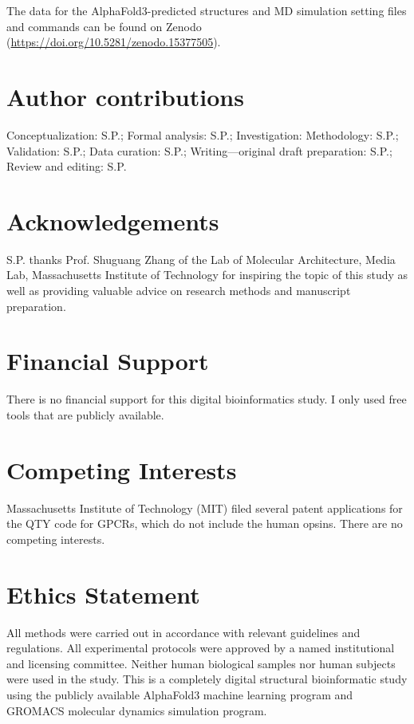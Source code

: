 \documentclass[fleqn, 10pt]{manuscript}
\begin{document}
The data for the AlphaFold3-predicted structures and MD simulation setting files and commands can be found on Zenodo (\url{https://doi.org/10.5281/zenodo.15377505}). 

\section*{Author contributions}

Conceptualization: S.P.; Formal analysis: S.P.; Investigation: Methodology: S.P.; Validation: S.P.; Data curation: S.P.; Writing—original draft preparation: S.P.; Review and editing: S.P. 

\section*{Acknowledgements}

S.P. thanks Prof. Shuguang Zhang of the Lab of Molecular Architecture, Media Lab, Massachusetts Institute of Technology for inspiring the topic of this study as well as providing valuable advice on research methods and manuscript preparation. 

\section*{Financial Support}

There is no financial support for this digital bioinformatics study. I only used free tools that are publicly available. 

\section*{Competing Interests}

Massachusetts Institute of Technology (MIT) filed several patent applications for the QTY code for GPCRs, which do not include the human opsins. There are no competing interests.


\section*{Ethics Statement}

All methods were carried out in accordance with relevant guidelines and regulations. All experimental protocols were approved by a named institutional and licensing committee. Neither human biological samples nor human subjects were used in the study. This is a completely digital structural bioinformatic study using the publicly available AlphaFold3 machine learning program and GROMACS molecular dynamics simulation program.
\end{document}
